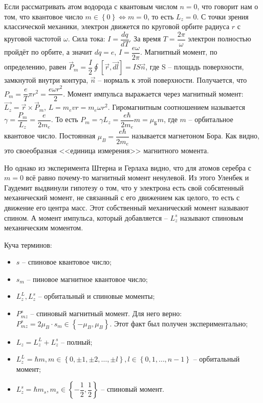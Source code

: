 Если рассматривать атом водорода с квантовым числом $n=0$, что говорит нам о том, что квантовое
число $m \in \left\{ 0 \right\} \Leftrightarrow m=0$, то есть $L_z = 0$. С точки зрения
классической механики, электрон движется
по круговой орбите радиуса $r$ с круговой частотой $\omega$. Сила тока: $I = \dfrac{dq}{dT}$.
За время $T = \dfrac{2\pi}{\omega}$ электрон полностью пройдёт по орбите, а значит $dq = e$, 
$I = \dfrac{e \omega}{2\pi}$. Магнитный момент, по определению, равен
$\vec{P}_m = \dfrac{I}{2} \oint [\vec{r}, \vec{dl}] = I S \vec{n}$, где S -- площадь
поверхности, замкнутой внутри контура, $\vec{n}$ -- нормаль к этой поверхности.
Получается, что $P_m = \dfrac{e}{T} \pi r^2 = \dfrac{e \omega r^2}{2}$. Момент импульса
выражается через магнитный момент: $\vec{L_z} = \vec{r} \times \vec{P}_m$,
$L = m_e vr = m_e \omega r^2$.
Гиромагнитным соотношением называется $\gamma = \dfrac{P_m}{L_z} = \dfrac{e}{2m_e}$. 
То есть $P_m = \gamma L_z = \dfrac{e \hbar}{2 m_e} m = \mu_\text{Б} m$, где $m$ -- орбитальное квантовое число.
Постоянная $\mu_B = \dfrac{e \hbar}{2 m_e}$ называется магнетоном Бора. Как видно, это 
своеобразная <<единица измерения>> магнитного момента. 

Но однако из эксперимента Штерна и Герлаха видно, что для атомов серебра с $m=0$ всё равно
почему-то магнитный момент ненулевой. Из этого Уленбек и Гаудемит выдвинули гипотезу о том, 
что у электрона есть свой собсвтенный механический момент, не связанный с его движением как целого,
то есть с движение его центра масс. Этот собственный механический момент называют спином.
А момент импульса, который добавляется -- $L_z^s$ называют спиновым механическим моментом.

Куча терминов:
\begin{itemize}
  \item $s$ -- спиновое квантовое число;
  \item $s_m$ -- пиновое магнитное квантовое число;
  \item $L_z^L, L_z^s$ -- орбитальный и спиновые моменты;
  \item $P_{mz}^s$ -- спиновый магнитный момент.
    Для него верно: $P_{mz}^s = 2 \mu_B \cdot s_m \in \left\{ -\mu_B, \mu_B \right\}$.
    Этот факт был получен экспериментально;
  \item $L_z = L_z^L + L_z^s$ -- полный;
  \item $L_z^L = \hbar m, m \in \left\{ 0, \pm 1, \pm 2, \dots, \pm l \right\}, l \in \left\{ 0, 1, \dots, n-1 \right\}$ -- орбитальный момент;
  \item $L_z^s = \hbar m_s, m_s \in \left\{ - \dfrac{1}{2}, \dfrac{1}{2} \right\}$ -- спиновый момент.
\end{itemize}
